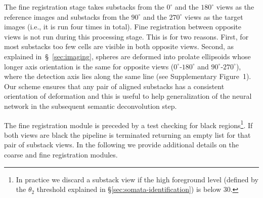 \documentclass[smallextended]{svjour3}       %
\begin{document}
The fine registration stage takes substacks from the $0^\circ$ and the
$180^\circ$ views as the reference images and substacks from the
$90^\circ$ and the $270^\circ$ views as the target images (i.e., it is
run four times in total). Fine registration between opposite views is
not run during this processing stage. This is for two reasons. First,
for most substacks too few cells are visible in both opposite views. Second, as
explained in~\S~\ref{sec:imaging}, spheres are deformed into prolate
ellipsoids whose longer axis orientation is the same for opposite
views ($0^\circ$-$180^\circ$ and $90^\circ$-$270^\circ$), where the
detection axis lies along the same line (see Supplementary Figure~1).
Our scheme ensures that any pair of aligned substacks has a consistent
orientation of deformation and this is useful to help generalization
of the neural network in the subsequent semantic deconvolution step.

The fine registration module is preceded by a test checking for black
regions\footnote{In practice we discard a substack view if the
  high foreground level (defined by the $\theta_2$ threshold explained in
  \S\ref{sec:somata-identification}) is below 30.}. If both views are
black the pipeline is terminated returning an empty list for that pair
of substack views.
In the following we provide additional details on the coarse and fine registration modules.
\end{document}
